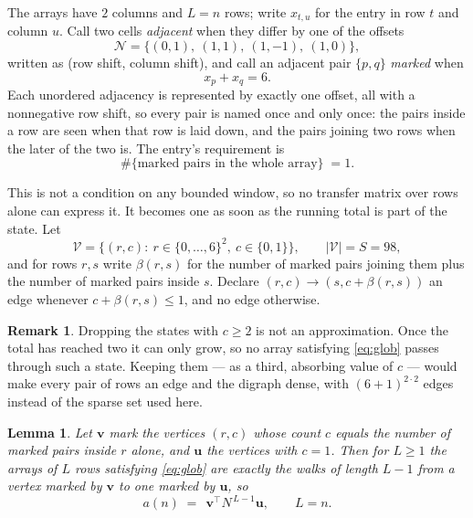 \documentclass[11pt,a4paper]{article}
\theoremstyle{plain}
\newtheorem{lemma}[theorem]{Lemma}
\theoremstyle{definition}
\newtheorem{remark}[theorem]{Remark}
\begin{document}
The arrays have $2$ columns and $L=n$ rows; write $x_{t,u}$ for the entry in
row $t$ and column $u$. Call two cells \emph{adjacent} when they differ by one of the
offsets
\[
\mathcal N=\{(0,1),\ (1,1),\ (1,-1),\ (1,0)\},
\]
written as (row shift, column shift), and call an adjacent pair $\{p,q\}$
\emph{marked} when
\[
x_{p}+x_{q}=6 .
\]
Each unordered adjacency is represented by exactly one offset, all with a nonnegative row
shift, so every pair is named once and only once: the pairs inside a row are seen when
that row is laid down, and the pairs joining two rows when the later of the two is. The
entry's requirement is
\begin{equation}\label{eq:glob}
\#\{\text{marked pairs in the whole array}\}\;=1.
\end{equation}

This is not a condition on any bounded window, so no transfer matrix over rows alone can
express it. It becomes one as soon as the running total is part of the state. Let
\[
\mathcal V=\bigl\{(r,c):\ r\in\{0,\dots,6\}^{2},\ c\in\{0,1\}\bigr\},
\qquad |\mathcal V|=S=98,
\]
and for rows $r,s$ write $\beta(r,s)$ for the number of marked pairs joining them plus the
number of marked pairs inside $s$. Declare $(r,c)\to(s,c+\beta(r,s))$ an edge whenever
$c+\beta(r,s)\le1$, and no edge otherwise.

\begin{remark}
Dropping the states with $c\ge2$ is not an approximation. Once the total has reached two it
can only grow, so no array satisfying \eqref{eq:glob} passes through such a state. Keeping
them --- as a third, absorbing value of $c$ --- would make every pair of rows an edge and
the digraph dense, with $(6+1)^{2\cdot2}$ edges instead of the sparse set used here.
\end{remark}

\begin{lemma}\label{lem:walk}
Let $\mathbf{v}$ mark the vertices $(r,c)$ whose count $c$ equals the number of marked pairs
inside $r$ alone, and $\mathbf{u}$ the vertices with $c=1$. Then for $L\ge1$ the arrays
of $L$ rows satisfying \eqref{eq:glob} are exactly the walks of length $L-1$ from a
vertex marked by $\mathbf{v}$ to one marked by $\mathbf{u}$, so
\[
a(n)\;=\;\,\mathbf{v}^{\!\top}N^{\,L-1}\mathbf{u},\qquad L=n .
\]
\end{lemma}
\end{document}
